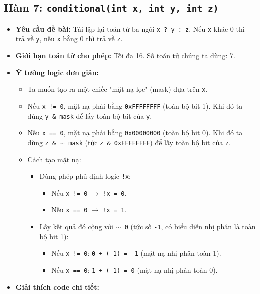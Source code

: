 \documentclass[12pt, a4paper]{article}
\begin{document}
\newpage

\subsection{Hàm 7: \texttt{conditional(int x, int y, int z)}}
\begin{itemize}
    \item \textbf{Yêu cầu đề bài:} Tái lập lại toán tử ba ngôi \texttt{x ? y : z}. Nếu \texttt{x} khác 0 thì trả về \texttt{y}, nếu \texttt{x} bằng 0 thì trả về \texttt{z}.
    \item \textbf{Giới hạn toán tử cho phép:} Tối đa 16. Số toán tử chúng ta dùng: 7.
    \item \textbf{Ý tưởng logic đơn giản:}
    \begin{itemize}
        \item Ta muốn tạo ra một chiếc "mặt nạ lọc" (mask) dựa trên \texttt{x}.
        \item Nếu \texttt{x != 0}, mặt nạ phải bằng \texttt{0xFFFFFFFF} (toàn bộ bit 1). Khi đó ta dùng \texttt{y \& mask} để lấy toàn bộ bit của \texttt{y}.
        \item Nếu \texttt{x == 0}, mặt nạ phải bằng \texttt{0x00000000} (toàn bộ bit 0). Khi đó ta dùng \texttt{z \& \(\sim\) mask} (tức \texttt{z \& 0xFFFFFFFF}) để lấy toàn bộ bit của \texttt{z}.
        \item Cách tạo mặt nạ:
        \begin{itemize}
            \item Dùng phép phủ định logic \texttt{!x}:
            \begin{itemize}
                \item Nếu \texttt{x != 0} $\rightarrow$ \texttt{!x = 0}.
                \item Nếu \texttt{x == 0} $\rightarrow$ \texttt{!x = 1}.
            \end{itemize}
            \item Lấy kết quả đó cộng với \texttt{\(\sim\) 0} (tức số \texttt{-1}, có biểu diễn nhị phân là toàn bộ bit 1):
            \begin{itemize}
                \item Nếu \texttt{x != 0}: \texttt{0 + (-1) = -1} (mặt nạ nhị phân toàn 1).
                \item Nếu \texttt{x == 0}: \texttt{1 + (-1) = 0} (mặt nạ nhị phân toàn 0).
            \end{itemize}
        \end{itemize}
    \end{itemize}
    \item \textbf{Giải thích code chi tiết:}



\end{itemize}
\end{document}
